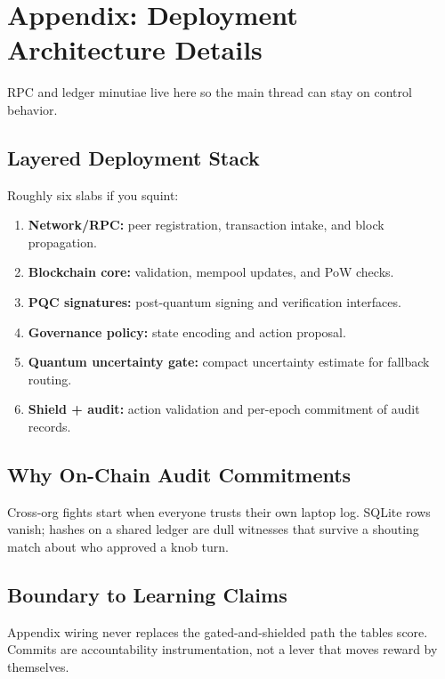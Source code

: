 \section{Appendix: Deployment Architecture Details}

RPC and ledger minutiae live here so the main thread can stay on control behavior.

\subsection{Layered Deployment Stack}

Roughly six slabs if you squint:
\begin{enumerate}
    \item \textbf{Network/RPC:} peer registration, transaction intake, and block propagation.
    \item \textbf{Blockchain core:} validation, mempool updates, and PoW checks.
    \item \textbf{PQC signatures:} post-quantum signing and verification interfaces.
    \item \textbf{Governance policy:} state encoding and action proposal.
    \item \textbf{Quantum uncertainty gate:} compact uncertainty estimate for fallback routing.
    \item \textbf{Shield + audit:} action validation and per-epoch commitment of audit records.
\end{enumerate}

\subsection{Why On-Chain Audit Commitments}

Cross-org fights start when everyone trusts their own laptop log. SQLite rows vanish; hashes on a shared ledger are dull witnesses that survive a shouting match about who approved a knob turn.

\subsection{Boundary to Learning Claims}

Appendix wiring never replaces the gated-and-shielded path the tables score. Commits are accountability instrumentation, not a lever that moves reward by themselves.
